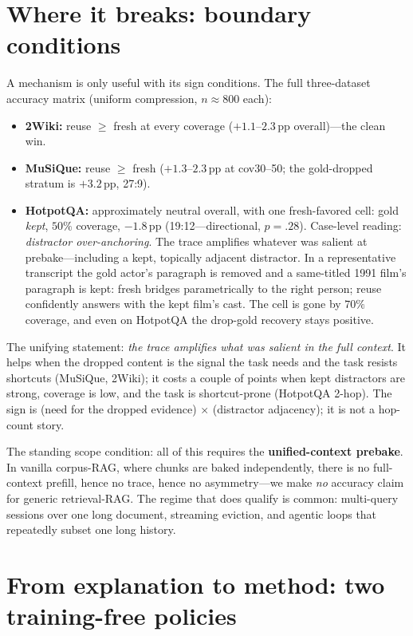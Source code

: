 \documentclass[11pt]{article}
\newcommand{\pp}{\,\mathrm{pp}}
\begin{document}
\section{Where it breaks: boundary conditions}
\label{sec:boundary}

A mechanism is only useful with its sign conditions. The full three-dataset accuracy matrix (uniform compression, $n\approx800$ each):

\begin{itemize}[leftmargin=2em]
\item \textbf{2Wiki:} reuse $\geq$ fresh at every coverage ($+1.1$--$2.3\pp$ overall)---the clean win.
\item \textbf{MuSiQue:} reuse $\geq$ fresh ($+1.3$--$2.3\pp$ at cov30--50; the gold-dropped stratum is $+3.2\pp$, 27:9).
\item \textbf{HotpotQA:} approximately neutral overall, with one fresh-favored cell: gold \emph{kept}, $50\%$ coverage, $-1.8\pp$ (19:12---directional, $p{=}.28$). Case-level reading: \emph{distractor over-anchoring}. The trace amplifies whatever was salient at prebake---including a kept, topically adjacent distractor. In a representative transcript the gold actor's paragraph is removed and a same-titled 1991 film's paragraph is kept: fresh bridges parametrically to the right person; reuse confidently answers with the kept film's cast. The cell is gone by $70\%$ coverage, and even on HotpotQA the drop-gold recovery stays positive.
\end{itemize}

The unifying statement: \emph{the trace amplifies what was salient in the full context}. It helps when the dropped content is the signal the task needs and the task resists shortcuts (MuSiQue, 2Wiki); it costs a couple of points when kept distractors are strong, coverage is low, and the task is shortcut-prone (HotpotQA 2-hop). The sign is (need for the dropped evidence) $\times$ (distractor adjacency); it is not a hop-count story.

The standing scope condition: all of this requires the \textbf{unified-context prebake}. In vanilla corpus-RAG, where chunks are baked independently, there is no full-context prefill, hence no trace, hence no asymmetry---we make \emph{no} accuracy claim for generic retrieval-RAG. The regime that does qualify is common: multi-query sessions over one long document, streaming eviction, and agentic loops that repeatedly subset one long history.

\section{From explanation to method: two training-free policies}
\label{sec:policies}
\end{document}
